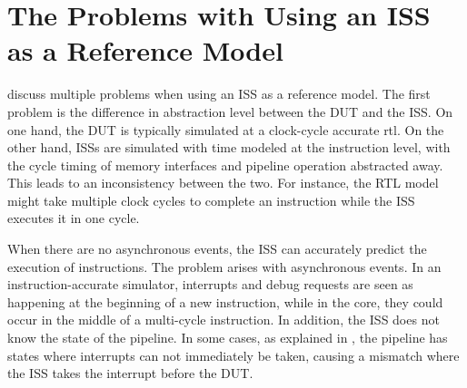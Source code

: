 %
%    



\section{The Problems with Using an ISS as a Reference Model}
\label{sec:back_issProblem}

\textcite{taylorAdvancedRISCVVerification2023}  discuss multiple problems when using an ISS as a reference model. The first problem is the difference in abstraction level between the DUT and the ISS. On one hand, the DUT is typically simulated at a clock-cycle accurate \acrfull{rtl}. On the other hand, ISSs are simulated with time modeled at the instruction level, with the cycle timing of memory interfaces and pipeline operation abstracted away. This leads to an inconsistency between the two. For instance, the RTL model might take multiple clock cycles to complete an instruction while the ISS executes it in one cycle.

When there are no asynchronous events, the ISS can accurately predict the execution of instructions. The problem arises with asynchronous events. In an instruction-accurate simulator, interrupts and debug requests are seen as happening at the beginning of a new instruction, while in the core, they could occur in the middle of a multi-cycle instruction. In addition, the ISS does not know the state of the pipeline. In some cases, as explained in , the pipeline has states where interrupts can not immediately be taken, causing a mismatch where the ISS takes the interrupt before the DUT.


